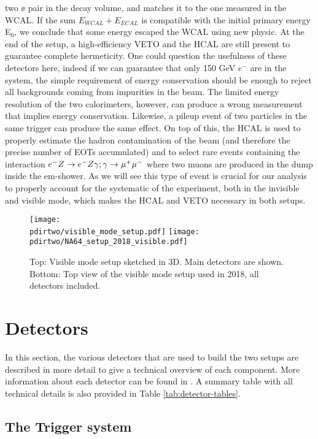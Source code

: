 two $\ee$ pair in the decay volume, and matches it to the one measured in the WCAL. If the sum $E_{WCAL}+E_{ECAL}$ is compatible with the initial primary energy E$_0$, we conclude that some energy escaped the WCAL using new physic. At the end of the setup, a high-efficiency VETO and the HCAL are still present to guarantee complete hermeticity. One could question the usefulness of these detectors here, indeed if we can guarantee that only 150 GeV $e^-$ are in the system, the simple requirement of energy conservation should be enough to reject all backgrounds coming from impurities in the beam. The limited energy resolution of the two calorimeters, however, can produce a wrong measurement that implies energy conservation. Likewise, a pileup event of two particles in the same trigger can produce the same effect. On top of this, the HCAL is used to properly estimate the hadron contamination of the beam (and therefore the precise number of EOTs accumulated) and to select rare events containing the interaction $e^- Z \to e^- Z \gamma; \gamma \to \mu^+ \mu^-$ where two muons are produced in the dump inside the em-shower. As we will see this type of event is crucial for our analysis to properly account for the systematic of the experiment, both in the invisible and visible mode, which makes the HCAL and VETO necessary in both setups.

\begin{figure}[tb]
  \centering
  \texttt{[image: \\pdirtwo/visible\_mode\_setup.pdf]}  
  \texttt{[image: \\pdirtwo/NA64\_setup\_2018\_visible.pdf]}
  \caption[NA64 visible mode setup 2018]{Top: Visible mode setup sketched in 3D. Main detectors are shown. Bottom: Top view of the visible mode setup used in 2018, all detectors included.}
  \label{fig:setup-vis-2018}
\end{figure}

\section{Detectors}
\label{ch2:sec:detectors}

In this section, the various detectors that are used to build the two setups are described in more detail to give a technical overview of each component. More information about each detector can be found in \cite{na64-hcal,na64-detectors,ABBON201569}. A summary table with all technical details is also provided in Table \ref{tab:detector-tables}.

\subsection{The Trigger system}
\label{ch2:sec:detectors-trigger}

